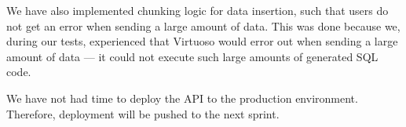 We have also implemented chunking logic for data insertion, such that users do not get an error when sending a large amount of data. This was done because we, during our tests, experienced that Virtuoso would error out when sending a large amount of data --- it could not execute such large amounts of generated SQL code.

We have not had time to deploy the API to the production environment. Therefore, deployment will be pushed to the next sprint.
